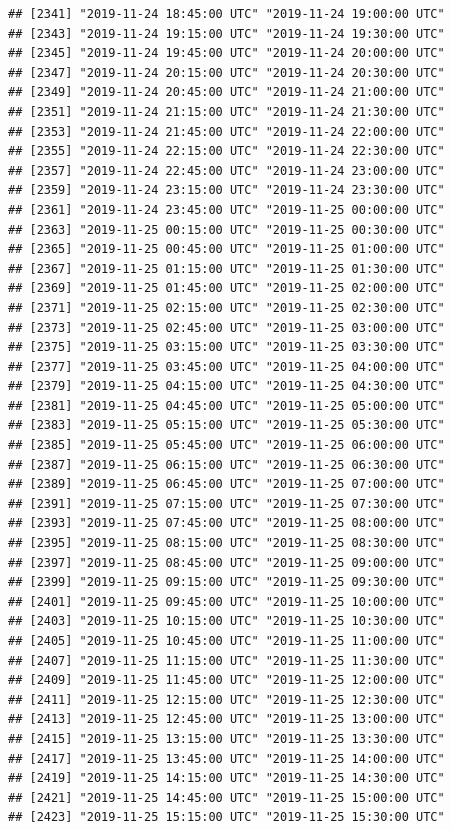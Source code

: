 \documentclass{article}\usepackage[]{graphicx}\usepackage[]{color}
\makeatletter
\newenvironment{kframe}{%
 \def\at@end@of@kframe{}%
 \ifinner\ifhmode%
  \def\at@end@of@kframe{\end{minipage}}%
  \begin{minipage}{\columnwidth}%
 \fi\fi%
 \def\FrameCommand##1{\hskip\@totalleftmargin \hskip-\fboxsep
 \colorbox{shadecolor}{##1}\hskip-\fboxsep
     \hskip-\linewidth \hskip-\@totalleftmargin \hskip\columnwidth}%
 \MakeFramed {\advance\hsize-\width
   \@totalleftmargin\z@ \linewidth\hsize
   \@setminipage}}%
 {\par\unskip\endMakeFramed%
 \at@end@of@kframe}
\newenvironment{knitrout}{}{} %
\makeatother
\begin{document}
\begin{knitrout}
\begin{kframe}
\begin{verbatim}
## [2341] "2019-11-24 18:45:00 UTC" "2019-11-24 19:00:00 UTC"
## [2343] "2019-11-24 19:15:00 UTC" "2019-11-24 19:30:00 UTC"
## [2345] "2019-11-24 19:45:00 UTC" "2019-11-24 20:00:00 UTC"
## [2347] "2019-11-24 20:15:00 UTC" "2019-11-24 20:30:00 UTC"
## [2349] "2019-11-24 20:45:00 UTC" "2019-11-24 21:00:00 UTC"
## [2351] "2019-11-24 21:15:00 UTC" "2019-11-24 21:30:00 UTC"
## [2353] "2019-11-24 21:45:00 UTC" "2019-11-24 22:00:00 UTC"
## [2355] "2019-11-24 22:15:00 UTC" "2019-11-24 22:30:00 UTC"
## [2357] "2019-11-24 22:45:00 UTC" "2019-11-24 23:00:00 UTC"
## [2359] "2019-11-24 23:15:00 UTC" "2019-11-24 23:30:00 UTC"
## [2361] "2019-11-24 23:45:00 UTC" "2019-11-25 00:00:00 UTC"
## [2363] "2019-11-25 00:15:00 UTC" "2019-11-25 00:30:00 UTC"
## [2365] "2019-11-25 00:45:00 UTC" "2019-11-25 01:00:00 UTC"
## [2367] "2019-11-25 01:15:00 UTC" "2019-11-25 01:30:00 UTC"
## [2369] "2019-11-25 01:45:00 UTC" "2019-11-25 02:00:00 UTC"
## [2371] "2019-11-25 02:15:00 UTC" "2019-11-25 02:30:00 UTC"
## [2373] "2019-11-25 02:45:00 UTC" "2019-11-25 03:00:00 UTC"
## [2375] "2019-11-25 03:15:00 UTC" "2019-11-25 03:30:00 UTC"
## [2377] "2019-11-25 03:45:00 UTC" "2019-11-25 04:00:00 UTC"
## [2379] "2019-11-25 04:15:00 UTC" "2019-11-25 04:30:00 UTC"
## [2381] "2019-11-25 04:45:00 UTC" "2019-11-25 05:00:00 UTC"
## [2383] "2019-11-25 05:15:00 UTC" "2019-11-25 05:30:00 UTC"
## [2385] "2019-11-25 05:45:00 UTC" "2019-11-25 06:00:00 UTC"
## [2387] "2019-11-25 06:15:00 UTC" "2019-11-25 06:30:00 UTC"
## [2389] "2019-11-25 06:45:00 UTC" "2019-11-25 07:00:00 UTC"
## [2391] "2019-11-25 07:15:00 UTC" "2019-11-25 07:30:00 UTC"
## [2393] "2019-11-25 07:45:00 UTC" "2019-11-25 08:00:00 UTC"
## [2395] "2019-11-25 08:15:00 UTC" "2019-11-25 08:30:00 UTC"
## [2397] "2019-11-25 08:45:00 UTC" "2019-11-25 09:00:00 UTC"
## [2399] "2019-11-25 09:15:00 UTC" "2019-11-25 09:30:00 UTC"
## [2401] "2019-11-25 09:45:00 UTC" "2019-11-25 10:00:00 UTC"
## [2403] "2019-11-25 10:15:00 UTC" "2019-11-25 10:30:00 UTC"
## [2405] "2019-11-25 10:45:00 UTC" "2019-11-25 11:00:00 UTC"
## [2407] "2019-11-25 11:15:00 UTC" "2019-11-25 11:30:00 UTC"
## [2409] "2019-11-25 11:45:00 UTC" "2019-11-25 12:00:00 UTC"
## [2411] "2019-11-25 12:15:00 UTC" "2019-11-25 12:30:00 UTC"
## [2413] "2019-11-25 12:45:00 UTC" "2019-11-25 13:00:00 UTC"
## [2415] "2019-11-25 13:15:00 UTC" "2019-11-25 13:30:00 UTC"
## [2417] "2019-11-25 13:45:00 UTC" "2019-11-25 14:00:00 UTC"
## [2419] "2019-11-25 14:15:00 UTC" "2019-11-25 14:30:00 UTC"
## [2421] "2019-11-25 14:45:00 UTC" "2019-11-25 15:00:00 UTC"
## [2423] "2019-11-25 15:15:00 UTC" "2019-11-25 15:30:00 UTC"

\end{verbatim}
\end{kframe}
\end{knitrout}
\end{document}
